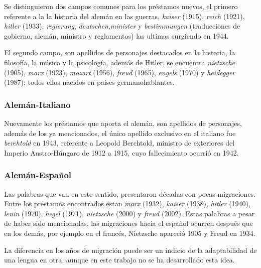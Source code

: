 
Se distinguieron dos campos comunes para los préstamos nuevos,  el primero referente a la  la historia del alemán en las guerras, \textit{kaiser} (1915), \textit{reich} (1921), \textit{hitler} (1933),  \textit{regierung}, \textit{deutschen},\textit{minister} y  \textit{bestimmungen} (traducciones de gobierno, alemán, ministro y reglamentos) las ultimas surgiendo en 1944.  

El segundo campo, son apellidos de  personajes destacados en la historia, la filosofía, la música y la psicología, además de Hitler, se encuentra  \textit{nietzsche} (1905),  \textit{marx} (1923),  \textit{mozart} (1956), \textit{freud} (1965), \textit{engels} (1970) y \textit{heidegger} (1987); todos ellos  nacidos en países germanohablantes.

\subsubsection*{Alemán-Italiano}%

Nuevamente los préstamos que aporta el alemán,  son apellidos de personajes,  además de los ya mencionados, el único apellido exclusivo en el italiano fue \textit{berchtold} en 1943, referente a Leopold Berchtold, ministro de exteriores del Imperio Austro-Húngaro de 1912 a 1915, cuyo fallecimiento ocurrió en 1942.


  
\subsubsection*{Alemán-Español}%

Las palabras que van en este sentido,  presentaron  décadas  con pocas migraciones. Entre los préstamos encontrados estan \textit{marx} (1932), \textit{kaiser} (1938), \textit{hitler} (1940), \textit{lenin} (1970), \textit{hegel} (1971),  \textit{nietzsche} (2000) y \textit{freud} (2002). Estas palabras a pesar de haber sido mencionadas,  las migraciones hacia el español ocurren después que en los demás, por ejemplo en el francés,  Nietzsche apareció 1905 y Freud en 1934. 

La diferencia en los años de migración puede ser un indicio de la adaptabilidad de una lengua en otra, aunque en este trabajo no se ha desarrollado esta idea. 




